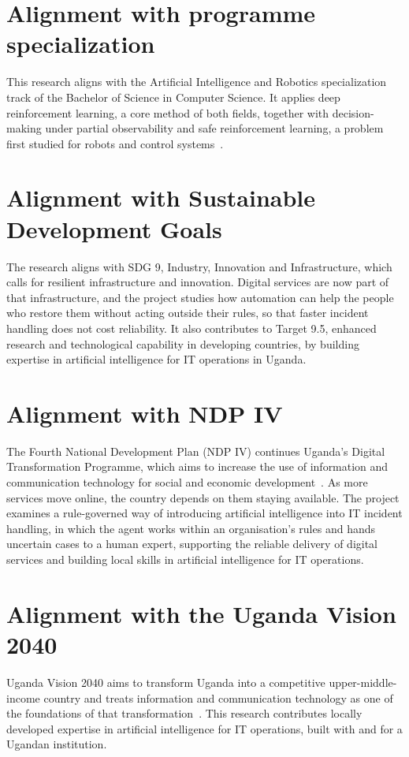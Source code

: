 \section{Alignment with programme specialization}

This research aligns with the Artificial Intelligence and Robotics specialization track of the Bachelor of Science in Computer Science. It applies deep reinforcement learning, a core method of both fields, together with decision-making under partial observability and safe reinforcement learning, a problem first studied for robots and control systems~\cite{alshiekh2018}.

\section{Alignment with Sustainable Development Goals}

The research aligns with SDG 9, Industry, Innovation and Infrastructure, which calls for resilient infrastructure and innovation. Digital services are now part of that infrastructure, and the project studies how automation can help the people who restore them without acting outside their rules, so that faster incident handling does not cost reliability. It also contributes to Target 9.5, enhanced research and technological capability in developing countries, by building expertise in artificial intelligence for IT operations in Uganda.

\section{Alignment with NDP IV}

The Fourth National Development Plan (NDP IV) continues Uganda's Digital Transformation Programme, which aims to increase the use of information and communication technology for social and economic development~\cite{ndp4}. As more services move online, the country depends on them staying available. The project examines a rule-governed way of introducing artificial intelligence into IT incident handling, in which the agent works within an organisation's rules and hands uncertain cases to a human expert, supporting the reliable delivery of digital services and building local skills in artificial intelligence for IT operations.

\section{Alignment with the Uganda Vision 2040}

Uganda Vision 2040 aims to transform Uganda into a competitive upper-middle-income country and treats information and communication technology as one of the foundations of that transformation~\cite{vision2040}. This research contributes locally developed expertise in artificial intelligence for IT operations, built with and for a Ugandan institution.

